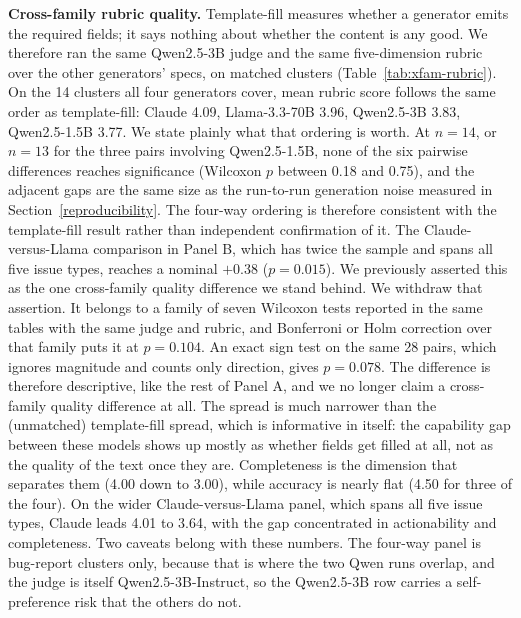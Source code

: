 \documentclass[preprint,12pt]{elsarticle}
\begin{document}
\textbf{Cross-family rubric quality.} Template-fill measures whether a generator emits the
required fields; it says nothing about whether the content is any good. We therefore ran the same
Qwen2.5-3B judge and the same five-dimension rubric over the other generators' specs, on matched
clusters (Table~\ref{tab:xfam-rubric}). On the 14 clusters all four generators cover, mean rubric
score follows the same order as template-fill: Claude 4.09, Llama-3.3-70B 3.96, Qwen2.5-3B 3.83,
Qwen2.5-1.5B 3.77. We state plainly what that ordering is worth. At $n=14$, or $n=13$ for the three pairs involving Qwen2.5-1.5B, none of the six
pairwise differences reaches significance (Wilcoxon $p$ between 0.18 and 0.75), and the adjacent
gaps are the same size as the run-to-run generation noise measured in
Section~\ref{reproducibility}. The four-way ordering is therefore consistent with the
template-fill result rather than independent confirmation of it. The Claude-versus-Llama
comparison in Panel B, which has twice the sample and spans all five issue types, reaches a
nominal $+0.38$ ($p = 0.015$). We previously asserted this as the one cross-family quality
difference we stand behind. We withdraw that assertion. It belongs to a family of seven Wilcoxon
tests reported in the same tables with the same judge and rubric, and Bonferroni or Holm
correction over that family puts it at $p = 0.104$. An exact sign test on the same 28 pairs,
which ignores magnitude and counts only direction, gives $p = 0.078$. The difference is therefore
descriptive, like the rest of Panel A, and we no longer claim a cross-family quality difference
at all. The spread is much narrower than the (unmatched) template-fill spread,
which is informative in itself: the capability gap between these models shows up mostly as
whether fields get filled at all, not as the quality of the text once they are. Completeness is
the dimension that separates them (4.00 down to 3.00), while accuracy is nearly flat (4.50 for
three of the four). On the wider Claude-versus-Llama panel, which spans all five issue types,
Claude leads 4.01 to 3.64, with the gap concentrated in actionability and completeness. Two
caveats belong with these numbers. The four-way panel is bug-report clusters only, because that
is where the two Qwen runs overlap, and the judge is itself Qwen2.5-3B-Instruct, so the
Qwen2.5-3B row carries a self-preference risk that the others do not.
\end{document}
